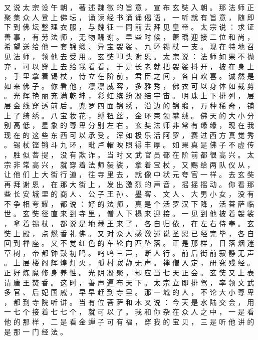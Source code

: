 {又 说 太 宗 设 午 朝 ， 著 述 魏 徵 的 旨 意 ， 宣 布 玄 奘 入 朝 。
那 法 师 正 聚 集 众 人 登 上 佛 坛 ， 诵 读 经 书 诵 诵 偈 语 ， 一 听 就 有 旨 意 ， 随 即 下 到 佛 坛 整 理 衣 服 ， 与 魏 征 一 同 前 去 拜 见 皇 帝 。
太 宗 说 ： 求 证 善 事 ， 有 劳 法 师 ， 无 物 酬 谢 。
早 些 时 候 ， 萧 瑀 迎 接 二 位 和 尚 ， 希 望 送 给 他 一 套 锦 缎 、 异 宝 袈 裟 、 九 环 锡 杖 一 支 。
现 在 特 地 召 见 法 师 ， 领 他 去 受 用 。
玄 奘 叩 头 谢 恩 。
太 宗 说 ： 法 师 如 果 不 抛 弃 ， 可 以 穿 上 去 给 我 看 看 。
于 是 长 老 就 把 袈 裟 抖 开 ， 披 在 身 上 ， 手 里 拿 着 锡 杖 ， 侍 立 在 阶 前 。
君 臣 之 间 ， 各 自 欢 喜 。
诚 然 是 如 来 佛 子 。
你 看 他 ， 凛 凛 威 容 ， 多 雅 秀 ， 佛 衣 可 以 身 体 如 裁 剪 。
光 辉 艳 丽 充 满 乾 坤 ， 彩 虹 缤 纷 凝 结 宇 宙 。
明 珠 上 下 排 列 ， 层 层 金 线 穿 透 前 后 。
兜 罗 四 面 锦 绣 ， 沿 边 的 锦 缎 ， 万 种 稀 奇 ， 铺 上 了 绮 绣 。
八 宝 妆 花 ， 缚 钮 丝 ， 金 环 束 领 攀 绒 。
佛 天 的 大 小 分 别 高 低 ， 星 象 的 尊 卑 分 别 左 右 。
玄 奘 法 师 非 常 有 缘 缘 ， 现 在 我 现 在 的 这 些 东 西 可 以 承 受 。
浑 如 极 乐 活 阿 罗 ， 赛 过 西 方 真 觉 秀 。
锡 杖 铿 锵 斗 九 环 ， 毗 卢 帽 映 照 得 丰 厚 。
如 果 真 是 佛 子 不 虚 传 ， 胜 似 菩 提 ， 没 有 欺 诈 。
当 时 文 武 官 员 都 在 阶 前 都 很 高 兴 。
太 宗 非 常 高 兴 ， 就 穿 着 法 师 袈 裟 ， 拿 着 宝 杖 ， 又 赐 给 两 队 仪 从 ， 让 他 们 上 大 街 行 道 ， 往 寺 里 去 ， 就 像 中 状 元 夸 官 一 样 。
去 玄 奘 再 拜 谢 恩 ， 在 那 大 街 上 ， 发 出 激 烈 的 声 音 ， 摇 摇 摇 动 。
你 看 那 些 长 安 城 里 的 商 人 、 公 子 王 孙 、 墨 客 、 文 人 、 大 男 小 女 ， 没 有 不 争 相 夸 耀 ， 都 说 ： 好 的 法 师 ， 真 是 个 活 罗 汉 下 降 ， 活 菩 萨 临 世 。
玄 奘 径 直 来 到 寺 里 ， 僧 人 下 榻 来 迎 接 。
一 见 到 他 披 着 袈 裟 ， 拿 着 锡 杖 ， 都 说 是 地 藏 王 来 了 ， 各 自 归 依 ， 在 左 右 侍 奉 。
玄 奘 上 殿 ， 点 燃 香 礼 佛 。
又 对 众 人 感 激 述 说 圣 恩 已 经 完 毕 ， 各 自 回 到 禅 座 。
又 不 觉 红 色 的 车 轮 向 西 坠 落 。
正 是 那 样 ， 日 落 烟 迷 草 树 ， 帝 都 钟 鼓 初 鸣 。
呜 呜 三 声 ， 断 人 行 。
前 后 街 前 寂 静 无 声 。
上 层 楼 阁 辉 煌 灯 火 ， 孤 村 寂 静 无 声 。
禅 僧 入 定 ， 研 究 残 经 。
正 好 炼 魔 修 身 养 性 。
光 阴 凝 聚 ， 却 应 当 七 天 正 会 。
玄 奘 又 上 表 请 唐 王 焚 香 。
这 时 ， 善 声 遍 布 天 下 。
太 宗 立 即 排 驾 ， 率 领 文 武 多 官 、 后 妃 国 戚 ， 早 早 赶 到 寺 里 。
那 一 城 的 人 ， 不 论 大 小 尊 卑 ， 都 到 寺 院 听 讲 。
当 有 位 菩 萨 和 木 叉 说 ： 今 天 是 水 陆 交 会 ， 用 一 七 个 接 着 七 七 个 ， 就 可 以 了 。
我 和 你 杂 在 众 人 之 中 ， 一 是 看 他 的 那 样 ， 二 是 看 金 蝉 子 可 有 福 ， 穿 我 的 宝 贝 ， 三 是 听 他 讲 的 是 那 一 门 经 法 。
}
